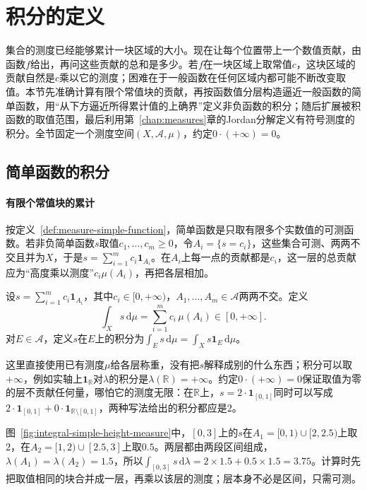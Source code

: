 \section{积分的定义}
\label{sec:integral-definition}

集合的测度已经能够累计一块区域的大小。现在让每个位置带上一个数值贡献，由函数$f$给出，再问这些贡献的总和是多少。若$f$在一块区域上取常值$c$，这块区域的贡献自然是$c$乘以它的测度；困难在于一般函数在任何区域内都可能不断改变取值。本节先准确计算有限个常值块的贡献，再按函数值分层构造逼近一般函数的简单函数，用“从下方逼近所得累计值的上确界”定义非负函数的积分；随后扩展被积函数的取值范围，最后利用第~\ref{chap:measures}章的Jordan分解定义有符号测度的积分。全节固定一个测度空间$(X,\mathcal A,\mu)$，约定$0\cdot(+\infty)=0$。

\subsection{简单函数的积分}
\label{sec:integral-simple}

\paragraph{有限个常值块的累计}
按定义~\ref{def:measure-simple-function}，简单函数是只取有限多个实数值的可测函数。若非负简单函数$s$取值$c_1,\dots,c_m\ge0$，令$A_i=\{s=c_i\}$，这些集合可测、两两不交且并为$X$，于是$s=\sum_{i=1}^mc_i\mathbf 1_{A_i}$。在$A_i$上每一点的贡献都是$c_i$，这一层的总贡献应为“高度乘以测度”$c_i\mu(A_i)$，再把各层相加。

\begin{definition}[非负简单函数的积分]
\label{def:integral-simple}
设$s=\sum_{i=1}^mc_i\mathbf 1_{A_i}$，其中$c_i\in[0,+\infty)$，$A_1,\dots,A_m\in\mathcal A$两两不交。定义
\[
 \int_Xs\,\mathrm d\mu=\sum_{i=1}^mc_i\,\mu(A_i)\in[0,+\infty].
\]
对$E\in\mathcal A$，定义$s$在$E$上的积分为$\int_Es\,\mathrm d\mu=\int_Xs\mathbf 1_E\,\mathrm d\mu$。
\end{definition}

这里直接使用已有测度$\mu$给各层称重，没有把$s$解释成别的什么东西；积分可以取$+\infty$，例如实轴上$\mathbf 1_{\mathbb R}$对$\lambda$的积分是$\lambda(\mathbb R)=+\infty$。约定$0\cdot(+\infty)=0$保证取值为零的层不贡献任何量，哪怕它的测度无限：在$\mathbb R$上，$s=2\cdot\mathbf 1_{[0,1]}$同时可以写成$2\cdot\mathbf 1_{[0,1]}+0\cdot\mathbf 1_{\mathbb R\setminus[0,1]}$，两种写法给出的积分都应是$2$。

图~\ref{fig:integral-simple-height-measure}中，$[0,3]$上的$s$在$A_1=[0,1)\cup[2,2.5)$上取$2$，在$A_2=[1,2)\cup[2.5,3]$上取$0.5$。两层都由两段区间组成，$\lambda(A_1)=\lambda(A_2)=1.5$，所以$\int_{[0,3]}s\,\mathrm d\lambda=2\times1.5+0.5\times1.5=3.75$。计算时先把取值相同的块合并成一层，再乘以该层的测度；层本身不必是区间，只需可测。

